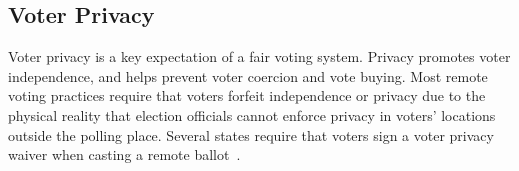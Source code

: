 
\subsection{Voter Privacy}

Voter privacy is a key expectation of a fair voting system. Privacy
promotes voter independence, and helps prevent voter coercion and vote
buying. Most remote voting practices require that voters forfeit
independence or privacy due to the physical reality that election
officials cannot enforce privacy in voters' locations outside the polling 
place. Several states require that voters sign a voter privacy
waiver when casting a remote ballot~\cite{smithtime}.


